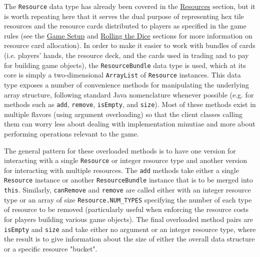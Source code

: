 \documentclass[pageno]{jpaper}
\begin{document}
\begin{doublespacing}
The \lstinline$Resource$ data type has already been covered in the \hyperlink{sec:resources}{Resources} section, but it is worth repeating here that it serves the dual purpose of representing hex tile resources and the resource cards distributed to players as specified in the game rules (see the \hyperlink{sec:game_setup}{Game Setup} and \hyperlink{sec:rolling_the_dice}{Rolling the Dice} sections for more information on resource card allocation). In order to make it easier to work with bundles of cards (i.e. players' hands, the resource deck, and the cards used in trading and to pay for building game objects), the \lstinline$ResourceBundle$ data type is used, which at its core is simply a two-dimensional \lstinline$ArrayList$ of \lstinline$Resource$ instances. This data type exposes a number of convenience methods for manipulating the underlying array structure, following standard Java nomenclature whenever possible (e.g. for methods such as \lstinline$add$, \lstinline$remove$, \lstinline$isEmpty$, and \lstinline$size$). Most of these methods exist in multiple flavors (using argument overloading) so that the client classes calling them can worry less about dealing with implementation minutiae and more about performing operations relevant to the game. 

The general pattern for these overloaded methods is to have one version for interacting with a single \lstinline$Resource$ or integer resource type and another version for interacting with multiple resources. The \lstinline$add$ methods take either a single \lstinline$Resource$ instance or another \lstinline$ResourceBundle$ instance that is to be merged into \lstinline$this$. Similarly, \lstinline$canRemove$ and \lstinline$remove$ are called either with an integer resource type or an array of size \lstinline$Resource.NUM_TYPES$ specifying the number of each type of resource to be removed (particularly useful when enforcing the resource costs for players building various game objects). The final overloaded method pairs are \lstinline$isEmpty$ and \lstinline$size$ and take either no argument or an integer resource type, where the result is to give information about the size of either the overall data structure or a specific resource "bucket". 


\end{doublespacing}
\end{document}
